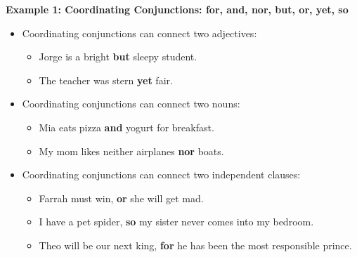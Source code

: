 \documentclass[12pt]{article}
\begin{document}
\begin{tcolorbox}[colframe=black!60, colback=white, 
coltitle=black, colbacktitle=black!15, fonttitle=\bfseries\Large, 
title=Examples, halign title=center, left=10pt, right=10pt, top=10pt, bottom=15pt]


\textbf{Example 1: Coordinating  Conjunctions: for, and, nor, but, or, yet, so}
\begin{itemize}

    \item Coordinating conjunctions can connect two adjectives:
    \begin{itemize}
        \item Jorge is a bright \textbf{but} sleepy student.
        \item The teacher was stern \textbf{yet} fair.
    \end{itemize}
    \item Coordinating conjunctions can connect two nouns: 
    \begin{itemize}
        \item Mia eats pizza \textbf{and} yogurt for breakfast.
        \item My mom likes neither airplanes \textbf{nor} boats.
    \end{itemize}
    \item Coordinating conjunctions can connect two independent clauses: 
    \begin{itemize}
        \item Farrah must win, \textbf{or} she will get mad.
        \item I have a pet spider, \textbf{so} my sister never comes into my bedroom.
        \item Theo will be our next king, \textbf{for} he has been the most responsible prince.
    \end{itemize}

\end{itemize}

     \end{tcolorbox}

\vspace{1em}
\end{document}
